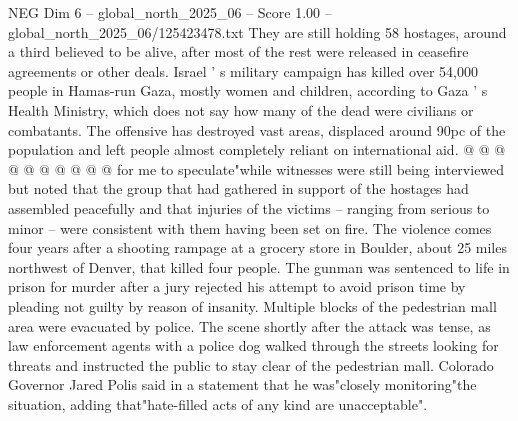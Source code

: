 \begin{textsample}{NEG Dim 6 – global\_north\_2025\_06 – Score 1.00 – global\_north\_2025\_06/125423478.txt}
They are still holding 58 hostages, around a third believed to be alive, after most of the rest were released in ceasefire agreements or other deals.
Israel ' s military campaign has killed over 54,000 people in Hamas-run Gaza, mostly women and children, according to Gaza ' s Health Ministry, which does not say how many of the dead were civilians or combatants.
The offensive has destroyed vast areas, displaced around 90pc of the population and left people almost completely reliant on international aid. @ @ @ @ @ @ @ @ @ @ for me to speculate"while witnesses were still being interviewed but noted that the group that had gathered in support of the hostages had assembled peacefully and that injuries of the victims -- ranging from serious to minor -- were consistent with them having been set on fire.
The violence comes four years after a shooting rampage at a grocery store in Boulder, about 25 miles northwest of Denver, that killed four people.
The gunman was sentenced to life in prison for murder after a jury rejected his attempt to avoid prison time by pleading not guilty by reason of insanity.
Multiple blocks of the pedestrian mall area were evacuated by police.
The scene shortly after the attack was tense, as law enforcement agents with a police dog walked through the streets looking for threats and instructed the public to stay clear of the pedestrian mall.
Colorado Governor Jared Polis said in a statement that he was"closely monitoring"the situation, adding that"hate-filled acts of any kind are unacceptable".

\end{textsample}
